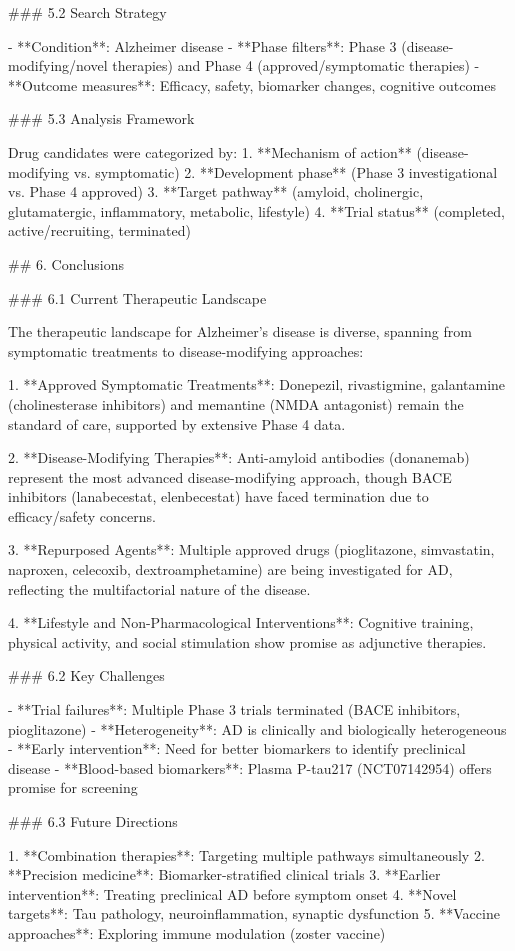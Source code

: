 ### 5.2 Search Strategy

- **Condition**: Alzheimer disease
- **Phase filters**: Phase 3 (disease-modifying/novel therapies) and Phase 4 (approved/symptomatic therapies)
- **Outcome measures**: Efficacy, safety, biomarker changes, cognitive outcomes

### 5.3 Analysis Framework

Drug candidates were categorized by:
1. **Mechanism of action** (disease-modifying vs. symptomatic)
2. **Development phase** (Phase 3 investigational vs. Phase 4 approved)
3. **Target pathway** (amyloid, cholinergic, glutamatergic, inflammatory, metabolic, lifestyle)
4. **Trial status** (completed, active/recruiting, terminated)

## 6. Conclusions

### 6.1 Current Therapeutic Landscape

The therapeutic landscape for Alzheimer's disease is diverse, spanning from symptomatic treatments to disease-modifying approaches:

1. **Approved Symptomatic Treatments**: Donepezil, rivastigmine, galantamine (cholinesterase inhibitors) and memantine (NMDA antagonist) remain the standard of care, supported by extensive Phase 4 data.

2. **Disease-Modifying Therapies**: Anti-amyloid antibodies (donanemab) represent the most advanced disease-modifying approach, though BACE inhibitors (lanabecestat, elenbecestat) have faced termination due to efficacy/safety concerns.

3. **Repurposed Agents**: Multiple approved drugs (pioglitazone, simvastatin, naproxen, celecoxib, dextroamphetamine) are being investigated for AD, reflecting the multifactorial nature of the disease.

4. **Lifestyle and Non-Pharmacological Interventions**: Cognitive training, physical activity, and social stimulation show promise as adjunctive therapies.

### 6.2 Key Challenges

- **Trial failures**: Multiple Phase 3 trials terminated (BACE inhibitors, pioglitazone)
- **Heterogeneity**: AD is clinically and biologically heterogeneous
- **Early intervention**: Need for better biomarkers to identify preclinical disease
- **Blood-based biomarkers**: Plasma P-tau217 (NCT07142954) offers promise for screening

### 6.3 Future Directions

1. **Combination therapies**: Targeting multiple pathways simultaneously
2. **Precision medicine**: Biomarker-stratified clinical trials
3. **Earlier intervention**: Treating preclinical AD before symptom onset
4. **Novel targets**: Tau pathology, neuroinflammation, synaptic dysfunction
5. **Vaccine approaches**: Exploring immune modulation (zoster vaccine)

